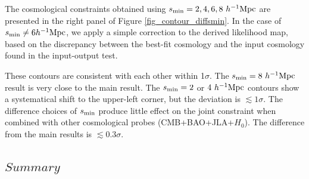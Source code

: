 \documentclass[iop]{emulateapj}
\begin{document}

The cosmological constraints obtained using $s_{\rm min}=2,4,6,8\ h^{-1} {\rm Mpc}$ 
are presented in the right panel of Figure \ref{fig_contour_diffsmin}.
In the case of $s_{\rm min}\neq6h^{-1} {\rm Mpc}$, we apply a simple correction to the derived likelihood map, 
based on the discrepancy between the best-fit cosmology and the input cosmology found in the input-output test.

These contours are consistent with each other within 1$\sigma$.
The $s_{\rm min}=8\ h^{-1}{\rm Mpc}$ result is very close to the main result.
The $s_{\rm min}=2$ or $4\ h^{-1}{\rm Mpc}$ contours show a systematical shift to the upper-left corner,
but the deviation is $\lesssim1\sigma$.
The difference choices of $s_{\rm min}$ produce little effect on 
the joint constraint when combined with other cosmological probes (CMB+BAO+JLA+$H_0$). 
The difference from the main results is $\lesssim0.3\sigma$.


\subsection{$Summary$}

\end{document}
